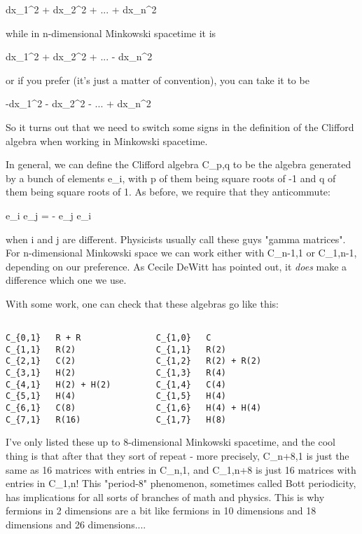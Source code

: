                         dx_{1}^{2} + dx_{2}^{2} + ... + dx_{n}^{2}  

while in n-dimensional Minkowski spacetime it is

                        dx_{1}^{2} + dx_{2}^{2} 
+ ... - dx_{n}^{2}   
 
or if you prefer (it's just a matter of convention), you can
take it to be

                       -dx_{1}^{2} - dx_{2}^{2} 
- ... + dx_{n}^{2}   


So it turns out that we need to switch some signs in the definition 
of the Clifford algebra when working in Minkowski spacetime.  

In general, we can define the Clifford algebra C_{p,q} to be the 
algebra generated by a bunch of elements e_{i}, with p of them 
being square roots 
of -1 and q of them being square roots of 1.  As before, we require that 
they anticommute:

e_{i} e_{j} = - e_{j} e_{i}

when i and j are different.  Physicists usually call these guys "gamma
matrices".  For n-dimensional Minkowski space we can work either
with C_{n-1,1} or C_{1,n-1}, depending on our preference.  
As Cecile DeWitt has pointed out, it \emph{does} 
make a difference which one we 
use.  

With some work, one can check that these algebras go like this:


\begin{verbatim}

C_{0,1}   R + R               C_{1,0}   C
C_{1,1}   R(2)                C_{1,1}   R(2)
C_{2,1}   C(2)                C_{1,2}   R(2) + R(2)
C_{3,1}   H(2)                C_{1,3}   R(4)
C_{4,1}   H(2) + H(2)         C_{1,4}   C(4)
C_{5,1}   H(4)                C_{1,5}   H(4)
C_{6,1}   C(8)                C_{1,6}   H(4) + H(4) 
C_{7,1}   R(16)               C_{1,7}   H(8)

\end{verbatim}
    
I've only listed these up to 8-dimensional Minkowski spacetime, and
the cool thing is that after that they sort of repeat - more precisely,
C_{n+8,1} is just the same as 16  matrices with entries in 
C_{n,1},
and C_{1,n+8} is just 16  matrices with entries in 
C_{1,n}!  
This "period-8" phenomenon, sometimes called Bott periodicity, has 
implications for all sorts of branches of math and physics.  This is
why fermions in 2 dimensions are a bit like fermions in 10 dimensions
and 18 dimensions and 26 dimensions....

